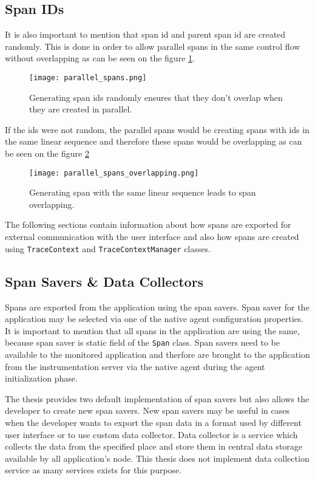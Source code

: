 \subsection{Span IDs}
It is also important to mention that span id and parent span id are created randomly. This is done in order to allow parallel spans in the same control flow without overlapping as can be seen on the figure \ref{fig:parallel_spans}.

	\begin{figure}
		\centering
		\texttt{[image: parallel\_spans.png]}
		\caption{Generating span ids randomly ensures that they don't overlap when they are created in parallel.}
		\label{fig:parallel_spans}
	\end{figure}
If the ids were not random, the parallel spans would be creating spans with ids in the same linear sequence and therefore these spans would be overlapping as can be seen on the figure \ref{fig:parallel_spans_overlapping}
	\begin{figure}
		\centering
		\texttt{[image: parallel\_spans\_overlapping.png]}
		\caption{Generating span with the same linear sequence leads to span overlapping.}
		\label{fig:parallel_spans_overlapping}
	\end{figure}
	
The following sections contain information about how spans are exported for external communication with the user interface and also how spans are created using \texttt{TraceContext} and \texttt{TraceContextManager} classes.
\subsection{Span Savers \& Data Collectors}
Spans are exported from the application using the span savers. Span saver for the application may be selected via one of the native agent configuration properties. It is important to mention that all spans in the application are using the same, because span saver is static field of the \texttt{Span} class. Span savers need to be available to the monitored application and therfore are brought to the application from the instrumentation server via the native agent during the agent initialization phase.

The thesis provides two default implementation of span savers but also allows the developer to create new span savers. New span savers may be useful in cases when the developer wants to export the span data in a format used by different user interface or to use custom data collector. Data collector is a service which collects the data from the specified place and store them in central data storage available by all application's node. This thesis does not implement data collection service as many services exists for this purpose. 

